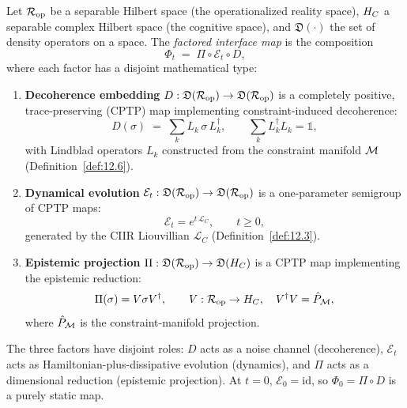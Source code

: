 \begin{definition}\label{def:12.1}
Let $\mathcal{R}_{\mathrm{op}}$ be a separable Hilbert space (the operationalized
reality space), $H_C$ a separable complex Hilbert space (the cognitive
space), and $\mathfrak{D}(\cdot)$ the set of density operators on a
space.  The \emph{factored interface map} is the composition
\begin{equation}\label{eq:phi-factor}
  \Phi_t \;=\; \Pi \circ \mathcal{E}_t \circ D,
\end{equation}
where each factor has a disjoint mathematical type:
\begin{enumerate}
  \item \textbf{Decoherence embedding}
    $D : \mathfrak{D}(\mathcal{R}_{\mathrm{op}}) \to \mathfrak{D}(\mathcal{R}_{\mathrm{op}})$
    is a completely positive, trace-preserving (CPTP) map implementing
    constraint-induced decoherence:
    \[
      D(\sigma) \;=\; \sum_{k} L_k \,\sigma\, L_k^\dagger, \qquad
      \sum_k L_k^\dagger L_k = \mathbb{1},
    \]
    with Lindblad operators $L_k$ constructed from the constraint manifold
    $\mathcal{M}$ (Definition~\ref{def:12.6}).

  \item \textbf{Dynamical evolution}
    $\mathcal{E}_t : \mathfrak{D}(\mathcal{R}_{\mathrm{op}}) \to \mathfrak{D}(\mathcal{R}_{\mathrm{op}})$
    is a one-parameter semigroup of CPTP maps:
    \[
      \mathcal{E}_t = e^{t\,\mathcal{L}_C}, \qquad t \geq 0,
    \]
    generated by the CIIR Liouvillian $\mathcal{L}_C$ (Definition~\ref{def:12.3}).

  \item \textbf{Epistemic projection}
    $\Pi : \mathfrak{D}(\mathcal{R}_{\mathrm{op}}) \to \mathfrak{D}(H_C)$
    is a CPTP map implementing the epistemic reduction:
    \[
      \Pi(\sigma) = V \sigma V^\dagger, \qquad
      V : \mathcal{R}_{\mathrm{op}} \to H_C, \quad V^\dagger V = \hat{P}_{\mathcal{M}},
    \]
    where $\hat{P}_{\mathcal{M}}$ is the constraint-manifold projection.
\end{enumerate}
\end{definition}

\begin{remark}
The three factors have disjoint roles: $D$ acts as a noise channel
(decoherence), $\mathcal{E}_t$ acts as Hamiltonian-plus-dissipative
evolution (dynamics), and $\Pi$ acts as a dimensional reduction
(epistemic projection).  At $t = 0$, $\mathcal{E}_0 = \mathrm{id}$, so
$\Phi_0 = \Pi \circ D$ is a purely static map.
\end{remark}

